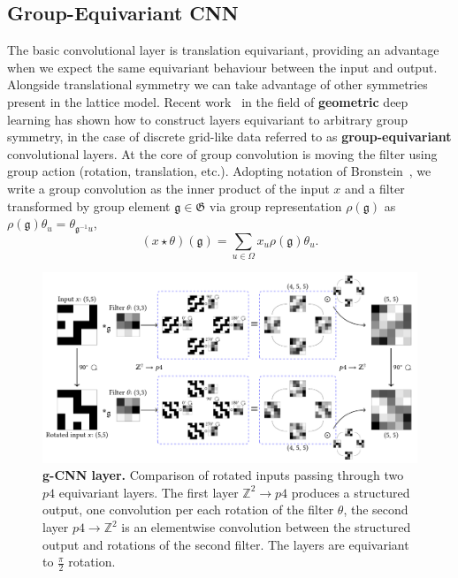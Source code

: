 \subsection{Group-Equivariant CNN}
The basic convolutional layer is translation equivariant, providing an advantage when we expect the same equivariant behaviour between the input and output. Alongside translational symmetry we can take advantage of other symmetries present in the lattice model. Recent work~\cite{cohen2016group, bronstein2021geometric} in the field of \textbf{geometric} deep learning has shown how to construct layers equivariant to arbitrary group symmetry, in the case of discrete grid-like data referred to as \textbf{group-equivariant} convolutional layers. At the core of {group convolution} is moving the filter using group action (rotation, translation, etc.). Adopting notation of Bronstein~\cite{bronstein2021geometric}, we write a group convolution as the inner product of the input $x$ and a filter transformed by group element $\mathfrak{g} \in \mathfrak{G}$ via group representation $\rho(\mathfrak{g})$ as $\rho(\mathfrak{g}) \theta_{u}=\theta_{\mathfrak{g}^{-1} u}$,
\begin{equation}
(x \star \theta)(\mathfrak{g})=\sum_{u \in \Omega} x_{u} \rho(\mathfrak{g}) \theta_{u}.
\end{equation}
\begin{figure}[h]
	\centering
	\includegraphics[width=\linewidth]{Chapter4/Figs/Vector/gcnn}
	\caption[Group-equivariant convolution]{\textbf{g-CNN layer.} Comparison of rotated inputs passing through two $p4$ equivariant layers. The first layer $\mathbb{Z}^2 \rightarrow p4$ produces a structured output, one convolution per each rotation of the filter $\theta$, the second layer $p4 \rightarrow \mathbb{Z}^2$ is an elementwise convolution between the structured output and rotations of the second filter. The layers are equivariant to $\frac{\pi}{2}$ rotation.}
	\label{fig:gcnn}
\end{figure}

